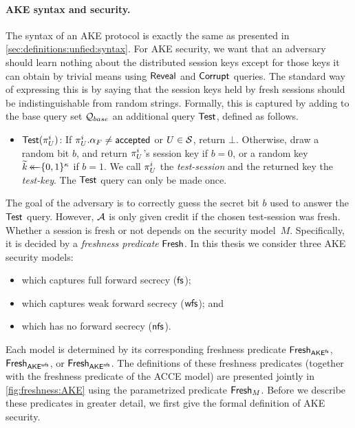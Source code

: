 \paragraph{AKE syntax and security.}
The syntax of an AKE protocol is exactly the same as presented in \cref{sec:definitions:unfied:syntax}.
For AKE security,
we want that an adversary should learn nothing about the distributed session keys except for those keys it can obtain by trivial means using $\mathsf{Reveal}$ and $\mathsf{Corrupt}$ queries.
The standard way of expressing this is by saying that the session keys held by fresh sessions should be indistinguishable from random strings.  
Formally,
this is captured by adding to the base query set $\mathcal{Q}_{base}$ an additional query $\mathsf{Test}$,
defined as follows.

\begin{itemize}
	\item $\Test(\oracle[U][i])$: 
	If $\oracle[U][i].\runstate_F \neq \accepted$ or $U \in \mathcal{S}$, return $\bot$.
	Otherwise,
	draw a random bit $b$,
	and	return $\oracle[U][i]$'s session key if $b = 0$, 
	or a random key $\widetilde{k} \operatorname{\leftarrow\mathrel{\mkern-14mu}\leftarrow} \lbrace 0, 1 \rbrace^\kappa$ if $b = 1$.
	We call $\oracle[U][i]$ the \emph{test-session} and the returned key the \emph{test-key}.
	The $\mathsf{Test}$ query can only be made once.
\end{itemize}

The goal of the adversary is to correctly guess the secret bit $b$ used to answer the $\mathsf{Test}$ query.
However,
$\mathcal{A}$ is only given credit if the chosen test-session was fresh.
Whether a session is fresh or not depends on the security model~$M$.
Specifically,
it is decided by a \emph{freshness predicate} $\mathsf{Fresh}$.
In this thesis we consider three AKE security models:
\begin{itemize}
	\item \akefstext which captures full forward secrecy ($\mathsf{fs}$);
	
	\item \akewfstext  which captures weak forward secrecy ($\mathsf{wfs}$); and
		
	\item \akenfstext which has no forward secrecy ($\mathsf{nfs}$).
\end{itemize}

Each model is determined by its corresponding freshness predicate $\mathsf{Fresh}_{\mathsf{AKE}^{\mathsf{fs}}}$, $\mathsf{Fresh}_{\mathsf{AKE}^{\mathsf{wfs}}}$, or $\mathsf{Fresh}_{\mathsf{AKE}^{\mathsf{nfs}}}$.
The definitions of these freshness predicates 
(together with the freshness predicate of the ACCE model)
are presented jointly in \cref{fig:freshness:AKE}
using the parametrized predicate $\mathsf{Fresh}_{M}$.
Before we describe these predicates in greater detail,
we first give the formal definition of AKE security.

